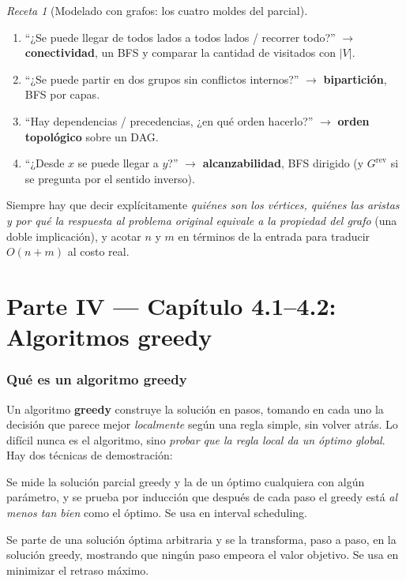 \documentclass[11pt,a4paper]{article}
\theoremstyle{plain}
\theoremstyle{definition}
\theoremstyle{remark}
\newtheorem*{receta}{Receta}
\begin{document}
\begin{receta}[Modelado con grafos: los cuatro moldes del parcial]
\begin{enumerate}[label=\arabic*.]
\item ``¿Se puede llegar de todos lados a todos lados / recorrer todo?'' $\to$
\textbf{conectividad}, un BFS y comparar la cantidad de visitados con $|V|$.
\item ``¿Se puede partir en dos grupos sin conflictos internos?'' $\to$
\textbf{bipartición}, BFS por capas.
\item ``Hay dependencias / precedencias, ¿en qué orden hacerlo?'' $\to$
\textbf{orden topológico} sobre un DAG.
\item ``¿Desde $x$ se puede llegar a $y$?'' $\to$ \textbf{alcanzabilidad}, BFS dirigido
(y $G^{\mathrm{rev}}$ si se pregunta por el sentido inverso).
\end{enumerate}
Siempre hay que decir explícitamente \emph{quiénes son los vértices, quiénes las
aristas y por qué la respuesta al problema original equivale a la propiedad del grafo}
(una doble implicación), y acotar $n$ y $m$ en términos de la entrada para traducir
$O(n+m)$ al costo real.
\end{receta}

\part*{Parte IV --- Capítulo 4.1--4.2: Algoritmos greedy}

\section{Qué es un algoritmo greedy}

Un algoritmo \textbf{greedy} construye la solución en pasos, tomando en cada uno la
decisión que parece mejor \emph{localmente} según una regla simple, sin volver atrás.
Lo difícil nunca es el algoritmo, sino \emph{probar que la regla local da un óptimo
global}. Hay dos técnicas de demostración:

\begin{description}[leftmargin=1.6em,style=nextline]
\item[Greedy stays ahead (``el greedy va adelante'').] Se mide la solución parcial
greedy y la de un óptimo cualquiera con algún parámetro, y se prueba por inducción que
después de cada paso el greedy está \emph{al menos tan bien} como el óptimo. Se usa en
interval scheduling.
\item[Exchange argument (argumento de intercambio).] Se parte de una solución óptima
arbitraria y se la transforma, paso a paso, en la solución greedy, mostrando que ningún
paso empeora el valor objetivo. Se usa en minimizar el retraso máximo.
\end{description}
\end{document}
